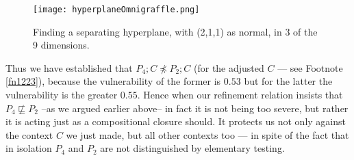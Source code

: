 \documentclass[runningheads]{llncs}
\newcommand\NotRef {\mathrel{\not\sqsubseteq}}
\newcommand\NotERef {\mathrel{\not\preceq}}
\begin{document}
\begin{wrapfigure}[18]{R}{.58\textwidth}
\texttt{[image: hyperplaneOmnigraffle.png]}
\caption{Finding a separating hyperplane, with (2,1,1) as normal, in 3 of the 9 dimensions.}\label{f1854}
\end{wrapfigure}
Thus we have established that $P_4;C \NotERef P_2;C$ (for the adjusted $C$ --- see Footnote \ref{fn1223}), because the vulnerability of the former is $0.53$ but for the latter the vulnerability is the greater $0.55$. Hence when our refinement relation insists that $P_4{\NotRef}P_2$ --as we argued earlier above-- in fact it is not being too severe, but rather it is acting just as a compositional closure should. It protects us not only against the context $C$ we just made, but all other contexts too --- in spite of the fact that in isolation $P_4$ and $P_2$ are not distinguished by elementary testing.
\end{document}
